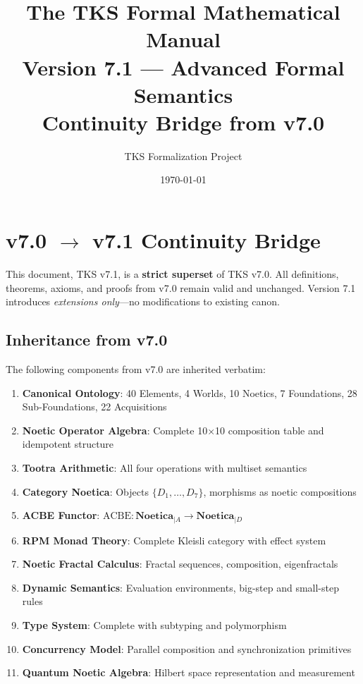 \documentclass[11pt,twoside,openright]{book}
\title{\Huge\textbf{The TKS Formal Mathematical Manual}\\[0.5em]
       \Large Version 7.1 — Advanced Formal Semantics\\[0.3em]
       \large Continuity Bridge from v7.0}
\author{TKS Formalization Project}
\date{\today}
\theoremstyle{definition}
\theoremstyle{plain}
\theoremstyle{remark}
\newcommand{\Noetica}{\mathbf{Noetica}}
\begin{document}
\frontmatter
\maketitle


\chapter*{v7.0 $\to$ v7.1 Continuity Bridge}

\begin{tcolorbox}[colback=yellow!10!white,colframe=orange!75!black,title=\textbf{Canonical Inheritance Declaration}]
This document, TKS v7.1, is a \textbf{strict superset} of TKS v7.0. All definitions, theorems, axioms, and proofs from v7.0 remain valid and unchanged. Version 7.1 introduces \textit{extensions only}---no modifications to existing canon.
\end{tcolorbox}

\section*{Inheritance from v7.0}

The following components from v7.0 are inherited verbatim:

\begin{enumerate}
  \item \textbf{Canonical Ontology}: 40 Elements, 4 Worlds, 10 Noetics, 7 Foundations, 28 Sub-Foundations, 22 Acquisitions
  \item \textbf{Noetic Operator Algebra}: Complete 10×10 composition table and idempotent structure
  \item \textbf{Tootra Arithmetic}: All four operations with multiset semantics
  \item \textbf{Category Noetica}: Objects $\{D_1, \ldots, D_7\}$, morphisms as noetic compositions
  \item \textbf{ACBE Functor}: $\mathrm{ACBE}: \Noetica_{|A} \to \Noetica_{|D}$
  \item \textbf{RPM Monad Theory}: Complete Kleisli category with effect system
  \item \textbf{Noetic Fractal Calculus}: Fractal sequences, composition, eigenfractals
  \item \textbf{Dynamic Semantics}: Evaluation environments, big-step and small-step rules
  \item \textbf{Type System}: Complete with subtyping and polymorphism
  \item \textbf{Concurrency Model}: Parallel composition and synchronization primitives
  \item \textbf{Quantum Noetic Algebra}: Hilbert space representation and measurement
\end{enumerate}
\end{document}
